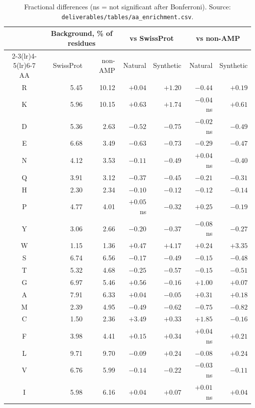 \documentclass[11pt,a4paper]{article}
\begin{document}
\begin{table}[H]\centering\small
\begin{tabular}{crrrrrr}
\toprule
 & \multicolumn{2}{c}{Background, \% of residues} & \multicolumn{2}{c}{vs SwissProt} & \multicolumn{2}{c}{vs non-AMP}\\
\cmidrule(lr){2-3}\cmidrule(lr){4-5}\cmidrule(lr){6-7}
AA & SwissProt & non-AMP & Natural & Synthetic & Natural & Synthetic\\\midrule
R & 5.45 & 10.12 & $+0.04$ & $+1.20$ & $-0.44$ & $+0.19$\\
K & 5.96 & 10.15 & $+0.63$ & $+1.74$ & $-0.04$ ns & $+0.61$\\
D & 5.36 & 2.63 & $-0.52$ & $-0.75$ & $-0.02$ ns & $-0.49$\\
E & 6.68 & 3.49 & $-0.63$ & $-0.73$ & $-0.29$ & $-0.47$\\
N & 4.12 & 3.53 & $-0.11$ & $-0.49$ & $+0.04$ ns & $-0.40$\\
Q & 3.91 & 3.12 & $-0.37$ & $-0.45$ & $-0.21$ & $-0.31$\\
H & 2.30 & 2.34 & $-0.10$ & $-0.12$ & $-0.12$ & $-0.14$\\
P & 4.77 & 4.01 & $+0.05$ ns & $-0.32$ & $+0.25$ & $-0.19$\\
Y & 3.06 & 2.66 & $-0.20$ & $-0.37$ & $-0.08$ ns & $-0.27$\\
W & 1.15 & 1.36 & $+0.47$ & $\mathbf{+4.17}$ & $+0.24$ & $\mathbf{+3.35}$\\
S & 6.74 & 6.56 & $-0.17$ & $-0.49$ & $-0.15$ & $-0.48$\\
T & 5.32 & 4.68 & $-0.25$ & $-0.57$ & $-0.15$ & $-0.51$\\
G & 6.97 & 5.46 & $+0.56$ & $-0.16$ & $+1.00$ & $+0.07$\\
A & 7.91 & 6.33 & $+0.04$ & $-0.05$ & $+0.31$ & $+0.18$\\
M & 2.39 & 4.95 & $-0.49$ & $-0.62$ & $-0.75$ & $-0.82$\\
C & 1.50 & 2.36 & $\mathbf{+3.49}$ & $+0.33$ & $\mathbf{+1.85}$ & $-0.16$\\
F & 3.98 & 4.41 & $+0.15$ & $+0.34$ & $+0.04$ ns & $+0.21$\\
L & 9.71 & 9.70 & $-0.09$ & $+0.24$ & $-0.08$ & $+0.24$\\
V & 6.76 & 5.99 & $-0.14$ & $-0.22$ & $-0.03$ ns & $-0.11$\\
I & 5.98 & 6.16 & $+0.04$ & $+0.07$ & $+0.01$ ns & $+0.04$\\\bottomrule
\end{tabular}
\caption{Fractional differences (ns = not significant after Bonferroni). Source: \texttt{deliverables/tables/aa\_enrichment.csv}.}
\end{table}
\end{document}
